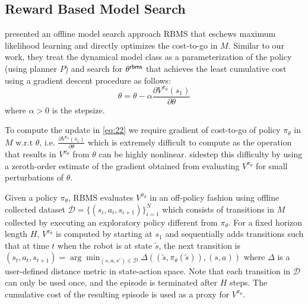 \subsection{Reward Based Model Search}
\label{sec:reward-based-model}

\cite{DBLP:conf/icra/JosephGRHR13} presented an offline model search
approach RBMS that eschews maximum likelihood learning and directly
optimizes the cost-to-go in $M$. Similar to our work, they treat the
dynamical model class as a parameterization of the policy (using
planner $P$) and search for $\theta^{\mathsf{rbms}}$ that achieves the least
cumulative cost using a gradient descent procedure as follows:
\begin{equation}
  \label{eq:22}
  \theta = \theta - \alpha \frac{\partial
    V^{\pi_{\theta}}(s_1)}{\partial {\theta}}
\end{equation}
where $\alpha > 0$ is the stepsize.

To compute the update in \eqref{eq:22} we require gradient of
cost-to-go of policy $\pi_{\theta}$ in $M$ w.r.t ${\theta}$,
i.e. $\frac{\partial
    V^{\pi_{\theta}}(s_1)}{\partial {\theta}}$ which is
  extremely difficult to compute as the operation that results in
  $V^{\pi_{\theta}}$ from ${\theta}$ can be highly
  nonlinear. \cite{DBLP:conf/icra/JosephGRHR13} sidestep this
  difficulty by using a zeroth-order estimate of the gradient obtained
  from evaluating $V^{\pi_{\theta}}$ for small perturbations of
  ${\theta}$.

  Given a policy $\pi_{{\theta}}$, RBMS evaluates $V^{\pi_{\theta}}$
  in an off-policy fashion using offline collected dataset
  $\mathcal{D} = \{(s_i, a_i, s_{i+1})\}_{i=1}^N$ which consists
  of transitions in $M$ collected by executing an exploratory policy
  different from $\pi_\theta$. For a fixed horizon length $H$,
  $V^{\pi_\theta}$ is computed by starting at $s_1$ and sequentially
  adds transitions such that at time $t$ when the robot is at state
  $\tilde{s}$, the next transition is $(s_t, a_t, s_{t+1}) =
  \arg\min_{(s, a, s') \in \mathcal{D}} \Delta((\tilde{s},
  \pi_\theta(\tilde{s})), (s, a))$ where $\Delta$ is a user-defined
  distance metric in state-action space. Note that each transition in
  $\mathcal{D}$ can only be used once, and the episode is terminated
  after $H$ steps. The cumulative cost of the resulting episode is
  used as a proxy for $V^{\pi_\theta}$.


